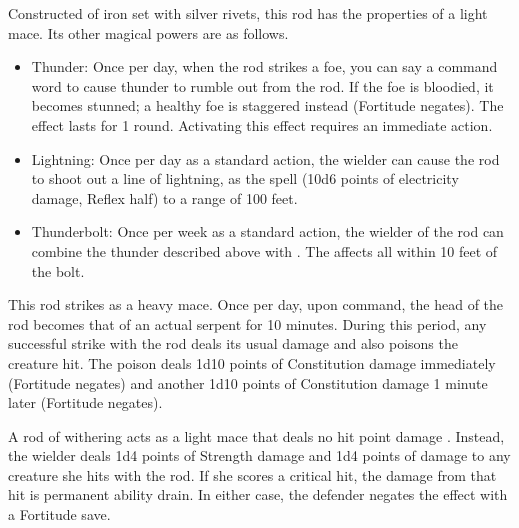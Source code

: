 
 Constructed of iron set with silver rivets, this rod has the properties of a  light mace. Its other magical powers are as follows.
\begin{itemize}
\item Thunder: Once per day, when the rod strikes a foe, you can say a command word to cause thunder to rumble out from the rod. If the foe is bloodied, it becomes stunned; a healthy foe is staggered instead (Fortitude negates). The effect lasts for 1 round. Activating this effect requires an immediate action.
\item Lightning: Once per day as a standard action, the wielder can cause the rod to shoot out a line of lightning, as the  spell (10d6 points of electricity damage, Reflex half) to a range of 100 feet.
\item Thunderbolt: Once per week as a standard action, the wielder of the rod can combine the thunder described above with . The  affects all within 10 feet of the bolt.
\end{itemize}


 This rod strikes as a  heavy mace. Once per day, upon command, the head of the rod becomes that of an actual serpent for 10 minutes. During this period, any successful strike with the rod deals its usual damage and also poisons the creature hit. The poison deals 1d10 points of Constitution damage immediately (Fortitude negates) and another 1d10 points of Constitution damage 1 minute later (Fortitude negates).


 A rod of withering acts as a  light mace that deals no hit point damage . Instead, the wielder deals 1d4 points of Strength damage and 1d4 points of  damage to any creature she hits with the rod. If she scores a critical hit, the damage from that hit is permanent ability drain. In either case, the defender negates the effect with a Fortitude save.

